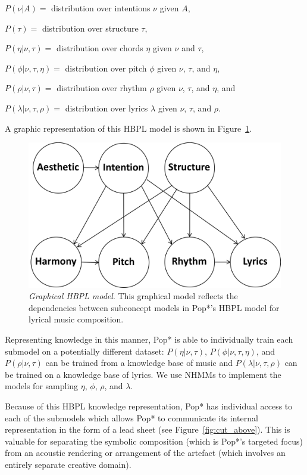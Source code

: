 \documentclass[phd,electronic,oneside,twosidetoc,letterpaper,chaptercenter,parttop,lol,lof,lot]{byumsphd}
\begin{document}
\(P(\nu|A)=\) distribution over intentions $\nu$ given $A$,

\(P(\tau)=\) distribution over structure $\tau$,

\(P(\eta|\nu,\tau)=\) distribution over chords $\eta$ given $\nu$ and $\tau$,

\(P(\phi|\nu,\tau,\eta)=\) distribution over pitch $\phi$ given $\nu$, $\tau$, and $\eta$, 

\(P(\rho|\nu,\tau)=\) distribution over rhythm $\rho$ given $\nu$, $\tau$, and $\eta$, and

\(P(\lambda|\nu,\tau,\rho)=\) distribution over lyrics $\lambda$ given $\nu$, $\tau$, and $\rho$.

\noindent A graphic representation of this HBPL model is shown in Figure~\ref{fig:graphical_model}.

\begin{figure}
    \centering
    \includegraphics[width=.6\linewidth]{graphical_model}
    \caption{\textit{Graphical HBPL model}. This graphical model reflects the dependencies between subconcept models in Pop*'s HBPL model for lyrical music composition.}
    \label{fig:graphical_model}
\end{figure}

Representing knowledge in this manner, Pop* is able to individually train each submodel on a potentially different dataset: $P(\eta|\nu,\tau)$, $P(\phi|\nu,\tau,\eta)$, and $P(\rho|\nu,\tau)$ can be trained from a knowledge base of music and $P(\lambda|\nu,\tau,\rho)$ can be trained on a knowledge base of lyrics. We use NHMMs to implement the models for sampling $\eta$, $\phi$, $\rho$, and $\lambda$. 

Because of this HBPL knowledge representation, Pop* has individual access to each of the submodels which allows Pop* to communicate its internal representation in the form of a lead sheet (see Figure~\ref{fig:cut_above}). This is valuable for separating the symbolic composition (which is Pop*'s targeted focus) from an acoustic rendering or arrangement of the artefact (which involves an entirely separate creative domain).
\end{document}
